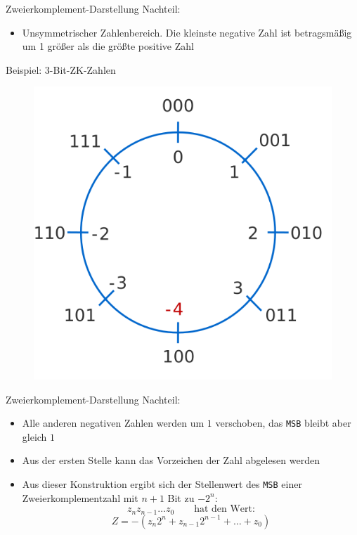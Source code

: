 \documentclass[12pt%
,aspectratio=169%
]{beamer}
\begin{document}
\begin{frame}{Zweierkomplement-Darstellung}
Nachteil:
\begin{itemize}
	\item Unsymmetrischer Zahlenbereich. Die kleinste negative Zahl ist betragsmäßig um 1 größer als die größte positive Zahl
\end{itemize}
Beispiel: 3-Bit-ZK-Zahlen
\begin{figure}
\hspace*{4cm}
\includegraphics[scale=0.32]{pictures/3bitzk}
\end{figure}

\end{frame}


\begin{frame}{Zweierkomplement-Darstellung}
Nachteil:
\begin{itemize}
	\item Alle anderen negativen Zahlen werden um $1$ verschoben, das \texttt{MSB} bleibt aber gleich $1$
	\item Aus der ersten Stelle kann das Vorzeichen der Zahl abgelesen werden
	\item Aus dieser Konstruktion ergibt sich der Stellenwert des \texttt{MSB} einer Zweierkomplementzahl mit $n+1$ Bit zu $-2^n$:
	$$
		z_n z_{n-1} \ldots z_0 \qquad \text{hat den Wert:}
	$$
	$$
		Z = - (z_n 2^n + z_{n-1} 2^{n-1} + \ldots + z_0)
	$$
\end{itemize}
\end{frame}
\end{document}
